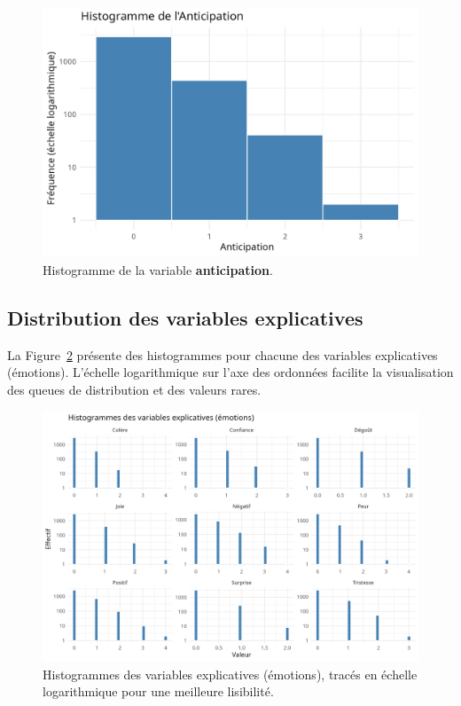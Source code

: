 \documentclass[12pt,a4paper]{article}
\begin{document}
\begin{figure}[H]
	\centering
	\includegraphics[width=1\textwidth]{figures/hist_anticipation.png}
	\caption{Histogramme de la variable \textbf{anticipation}.}
	\label{fig:hist_anticipation}
\end{figure}

\subsection{Distribution des variables explicatives}
La Figure~\ref{fig:hist_explicatives} présente des histogrammes pour chacune des variables
explicatives (émotions). L’échelle logarithmique sur l’axe des ordonnées facilite la visualisation
des queues de distribution et des valeurs rares.

\begin{figure}[H]
	\centering
	\includegraphics[width=1\textwidth]{figures/hist_all_explicatives.png}
	\caption{Histogrammes des variables explicatives (émotions), tracés en échelle logarithmique
		pour une meilleure lisibilité.}
	\label{fig:hist_explicatives}
\end{figure}
\end{document}
